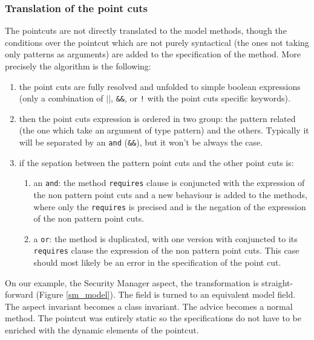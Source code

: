 \subsubsection{Translation of the point cuts}
The pointcuts are not directly translated to the model methods, though
the conditions over the pointcut which are not purely syntactical (the
ones not taking only patterns as arguments) are added to the
specification of the method.  More precisely the algorithm is the
following:
\begin{enumerate}
\item 
the point cuts are fully resolved and unfolded to simple boolean
expressions (only a combination of {\tt $||$}, {\tt \&\&}, or {\tt !}
with the point cuts specific keywords).
\item 
then the point cuts expression is ordered in two group: the pattern
related (the one which take an argument of type pattern) and the
others. Typically it will be separated by an {\tt and} ({\tt \&\&}),
but it won't be always the case.
\item 
if the sepation between the pattern point cuts and the other point
cuts is:
\begin{enumerate}
\item 
an {\tt and}: the method {\tt requires} clause is conjuncted with the
expression of the non pattern point cuts and a new behaviour is added
to the methods, where only the {\tt requires} is precised and is the
negation of the expression of the non pattern point cuts.
\item 
a {\tt or}: the method is duplicated, with one version with conjuncted
 to its {\tt requires} clause the expression of the non pattern point
 cuts. This case should most likely be an error in the specification
 of the point cut.
\end{enumerate}
\end{enumerate}

On our example, the Security Manager aspect, the transformation is
straight-forward (Figure \ref{sm_model}).
 The field is turned to an equivalent model field. The 
aspect invariant becomes a class invariant. The advice becomes a normal 
method. The pointcut was entirely static so the specifications do not have
to be enriched with the dynamic elements of the pointcut.




